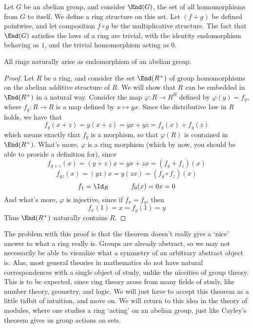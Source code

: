\begin{example}
    Let $G$ be an abelian group, and consider $\End(G)$, the set of all homomorphisms from $G$ to itself. We define a ring structure on this set. Let $(f + g)$ be defined pointwise, and let composition $f \circ g$ be the multiplicative structure. The fact that $\End(G)$ satisfies the laws of a ring are trivial, with the identity endomorphism behaving as $1$, and the trivial homomorphism acting as $0$.
\end{example}

\begin{theorem}
    All rings naturally arise as endomorphism of an abelian group.
\end{theorem}
\begin{proof}
    Let $R$ be a ring, and consider the set $\End(R^+)$ of group homomorphisms on the abelian additive structure of $R$. We will show that $R$ can be embedded in $\End(R^+)$ in a natural way. Consider the map $\varphi: R \to R^R$ defined by $\varphi(y) = f_y$, where $f_y:R \to R$ is a map defined by $x \mapsto yx$. Since the distributive law in $R$ holds, we have that
    \[ f_y(x + z) = y(x + z) = yx + yz = f_y(x) + f_y(z) \]
    which means exactly that $f_y$ is a morphism, so that $\varphi(R)$ is contained in $\End(R^+)$. What's more, $\varphi$ is a ring morphism (which by now, you should be able to provide a definition for), since
    \[ f_{y + z}(x) = (y + z)x = yx + zx = (f_y + f_z)(x) \]
    \[ f_{yz}(x) = (yz)x = y(zx) = (f_y \circ f_z)(x) \]
    \[ f_1 = \Id_R\ \ \ \ \ \ \ \ \ \  f_0(x) = 0x = 0 \]
    And what's more, $\varphi$ is injective, since if $f_x = f_y$, then
    \[ f_x(1) = x = f_y(1) = y \]
    Thus $\End(R^+)$ naturally contains $R$.
\end{proof}

The problem with this proof is that the theorem doesn't really give a `nice' answer to what a ring really is. Groups are already abstract, so we may not necessarily be able to visualize what a symmetry of an arbitrary abstract object is. Alas, most general theories in mathematics do not have natural correspondences with a single object of study, unlike the niceities of group theory. This is to be expected, since ring theory arose from many fields of study, like number theory, geometry, and logic. We will just have to accept this theorem as a little tidbit of intuition, and move on. We will return to this idea in the theory of modules, where one studies a ring `acting' on an abelian group, just like Cayley's theorem gives us group actions on sets.

